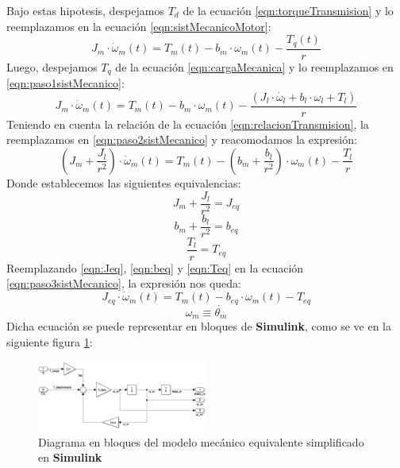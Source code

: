 \documentclass[10pt]{article}
\begin{document}
\begin{itemize}
	Bajo estas hipotesis, despejamos $T_{d}$ de la ecuación \ref{eqn:torqueTransmision} y lo reemplazamos en la ecuación \ref{eqn:sistMecanicoMotor}:
	\begin{equation}
		\label{eqn:paso1sistMecanico}
		J_{m}\cdot \dot{\omega }_{m}\left ( t \right )=T_{m}\left ( t \right )-b_{m}\cdot \omega_{m}\left ( t \right )-\frac{T_{q}\left ( t \right )}{r}
	\end{equation}
	Luego, despejamos $T_{q}$ de la ecuación \ref{eqn:cargaMecanica} y lo reemplazamos en \ref{eqn:paso1sistMecanico}:
	\begin{equation}
		\label{eqn:paso2sistMecanico}
		J_{m}\cdot \dot{\omega }_{m}\left ( t \right )=T_{m}\left ( t \right )-b_{m}\cdot \omega_{m}\left ( t \right )-\frac{\left ( J_{l}\cdot \dot{\omega_{l}}+b_{l}\cdot \omega_{l}+T_{l} \right )}{r}
	\end{equation}
	Teniendo en cuenta la relación de la ecuación \ref{eqn:relacionTransmision}, la reemplazamos en \ref{eqn:paso2sistMecanico} y reacomodamos la expresión:
	\begin{equation}
		\label{eqn:paso3sistMecanico}
		\left ( J_{m}+\frac{J_{l}}{r^{2}} \right )\cdot \dot{\omega }_{m}\left ( t \right )=T_{m}\left ( t \right )-\left ( b_{m}+\frac{b_{l}}{r^{2}} \right )\cdot \omega_{m}\left ( t \right )-\frac{T_{l}}{r}
	\end{equation}
	Donde establecemos las siguientes equivalencias:
	\begin{equation}
		\label{eqn:Jeq}
		J_{m}+\frac{J_{l}}{r^{2}}=J_{eq}
	\end{equation}
	\begin{equation}
		\label{eqn:beq}
		b_{m}+\frac{b_{l}}{r^{2}}=b_{eq}
	\end{equation}
	\begin{equation}
		\label{eqn:Teq}
		\frac{T_{l}}{r}=T_{eq}
	\end{equation}
	Reemplazando \ref{eqn:Jeq}, \ref{eqn:beq} y \ref{eqn:Teq} en la ecuación \ref{eqn:paso3sistMecanico}, la expresión nos queda:
	\begin{equation}
		\label{sist:mecanico}
		J_{eq}\cdot \dot{\omega }_{m}\left ( t \right )=T_{m}\left ( t \right )-b_{eq}\cdot \omega_{m}\left ( t \right )-T_{eq}
	\end{equation}
	\begin{equation}
		\label{globalNL:omegaM}
		\omega_{m} \equiv \dot{\theta_{m}}
	\end{equation}
	Dicha ecuación se puede representar en bloques de \textbf{Simulink}, como se ve en la siguiente figura \ref{fig:MecanicoEquivalente}:
	\begin{figure}[h!]
		\centering
		\includegraphics[width=0.5\textwidth]{2_1_1_ModeloMecanicoEquivalente.png}
		\caption{\label{fig:MecanicoEquivalente} Diagrama en bloques del modelo mecánico equivalente simplificado en \textbf{Simulink}}
	\end{figure}


\end{itemize}
\end{document}

